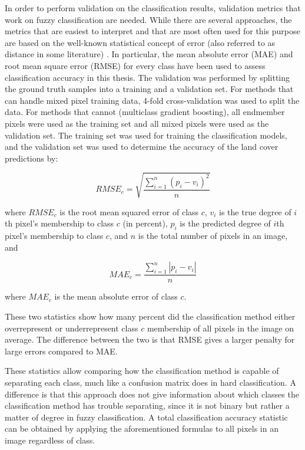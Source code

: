 \documentclass[a4paper,12pt]{scrbook}
\begin{document}
In order to perform validation on the classification results, validation metrics that work on fuzzy classification are needed. While there are several approaches, the metrics that are easiest to interpret and that are most often used for this purpose are based on the well-known statistical concept of error (also referred to as distance in some literature) \citep{foody1996fuzzyevaluation}. In particular, the mean absolute error (MAE) and root mean square error (RMSE) for every class have been used to assess classification accuracy in this thesis. The validation was performed by splitting the ground truth samples into a training and a validation set. For methods that can handle mixed pixel training data, 4-fold cross-validation was used to split the data. For methods that cannot (multiclass gradient boosting), all endmember pixels were used as the training set and all mixed pixels were used as the validation set. The training set was used for training the classification models, and the validation set was used to determine the accuracy of the land cover predictions by:

$$ RMSE_c = \sqrt{ \frac{\displaystyle\sum_{i=1}^{n}{ (p_{i} - v_{i})^2 }}{n} } $$

where $ RMSE_c $ is the root mean squared error of class $ c $, $ v_{i} $ is the true degree of $ i $th pixel's membership to class $ c $ (in percent), $ p_i $ is the predicted degree of $ i $th pixel's membership to class $ c $, and $ n $ is the total number of pixels in an image, and

$$ MAE_c = \frac{\displaystyle\sum_{i=1}^{n}{ |p_{i} - v_{i}| }}{n} $$

where $ MAE_c $ is the mean absolute error of class $ c $.

These two statistics show how many percent did the classification method either overrepresent or underrepresent class $ c $ membership of all pixels in the image on average. The difference between the two is that RMSE gives a larger penalty for large errors compared to MAE.

These statistics allow comparing how the classification method is capable of separating each class, much like a confusion matrix does in hard classification. A difference is that this approach does not give information about which classes the classification method has trouble separating, since it is not binary but rather a matter of degree in fuzzy classification. A total classification accuracy statistic can be obtained by applying the aforementioned formulas to all pixels in an image regardless of class.
\end{document}
